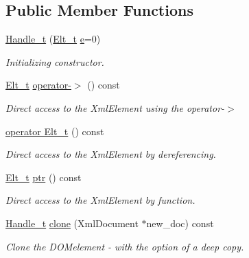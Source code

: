 \subsection*{Public Member Functions}
\begin{DoxyCompactItemize}
\item 
\hyperlink{class_d_d4hep_1_1_x_m_l_1_1_handle__t_a0fc9a01b5b31be8aff39ffc2b1f9e324}{Handle\+\_\+t} (\hyperlink{class_d_d4hep_1_1_x_m_l_1_1_handle__t_a81a72155f29971b37652430a334a6b30}{Elt\+\_\+t} \hyperlink{_volumes_8cpp_a8a9a1f93e9b09afccaec215310e64142}{e}=0)
\begin{DoxyCompactList}\small\item\em Initializing constructor. \end{DoxyCompactList}\item 
\hyperlink{class_d_d4hep_1_1_x_m_l_1_1_handle__t_a81a72155f29971b37652430a334a6b30}{Elt\+\_\+t} \hyperlink{class_d_d4hep_1_1_x_m_l_1_1_handle__t_af3c62f63d2814f17755b95e25b2ec5c8}{operator-\/$>$} () const
\begin{DoxyCompactList}\small\item\em Direct access to the Xml\+Element using the operator-\/$>$ \end{DoxyCompactList}\item 
\hyperlink{class_d_d4hep_1_1_x_m_l_1_1_handle__t_a1e55a5b7b3a8da11999dd1b4cb3d11da}{operator Elt\+\_\+t} () const
\begin{DoxyCompactList}\small\item\em Direct access to the Xml\+Element by dereferencing. \end{DoxyCompactList}\item 
\hyperlink{class_d_d4hep_1_1_x_m_l_1_1_handle__t_a81a72155f29971b37652430a334a6b30}{Elt\+\_\+t} \hyperlink{class_d_d4hep_1_1_x_m_l_1_1_handle__t_a7b454a7c9cee6df653be043c17e31cde}{ptr} () const
\begin{DoxyCompactList}\small\item\em Direct access to the Xml\+Element by function. \end{DoxyCompactList}\item 
\hyperlink{class_d_d4hep_1_1_x_m_l_1_1_handle__t}{Handle\+\_\+t} \hyperlink{class_d_d4hep_1_1_x_m_l_1_1_handle__t_a3b0eabdd2c04006c3c4b578eea162661}{clone} (Xml\+Document $\ast$new\+\_\+doc) const
\begin{DoxyCompactList}\small\item\em Clone the D\+O\+Melement -\/ with the option of a deep copy. \end{DoxyCompactList}\item 

\end{DoxyCompactItemize}
